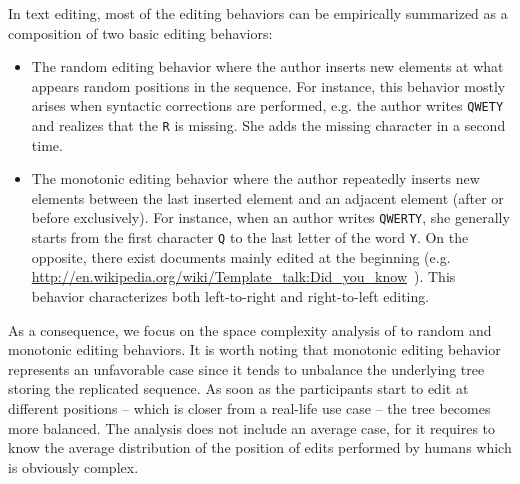 In text editing, most of the editing behaviors can be empirically summarized as
a composition of two basic editing behaviors:
\begin{itemize}
\item The random editing behavior where the author inserts new elements at what
  appears random positions in the sequence. For instance, this behavior mostly
  arises when syntactic corrections are performed, e.g. the author writes
  \texttt{QWETY} and realizes that the \texttt{R} is missing. She adds the
  missing character in a second time.
\item The monotonic editing behavior where the author repeatedly inserts new
  elements between the last inserted element and an adjacent element (after or
  before exclusively). For instance, when an author writes \texttt{QWERTY}, she
  generally starts from the first character \texttt{Q} to the last letter of the
  word \texttt{Y}. On the opposite, there exist documents mainly edited at the
  beginning
  (e.g. \url{http://en.wikipedia.org/wiki/Template_talk:Did_you_know}~\cite{nedelec2013lseq}). This
  behavior characterizes both left-to-right and right-to-left editing.
\end{itemize}

\noindent As a consequence, we focus on the space complexity analysis of \LSEQ
to random and monotonic editing behaviors. It is worth noting that monotonic
editing behavior represents an unfavorable case since it tends to unbalance the
underlying tree storing the replicated sequence. As soon as the participants
start to edit at different positions -- which is closer from a real-life use
case -- the tree becomes more balanced.
The analysis does not include an average case, for it requires to know
the average distribution of the position of edits performed by humans which is
obviously complex.

